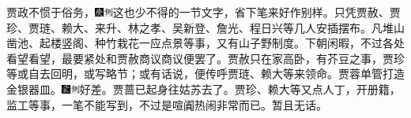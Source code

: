 {{{{{{{{{贾政不惯于俗务，{\includegraphics[width=3mm]{../Images/00004}\includegraphics[width=3mm]{../Images/00011}\footnotesize \kaishu 这也少不得的一节文字，省下笔来好作别样。}只凭贾赦、贾珍、贾琏、赖大、来升、林之孝、吴新登、詹光、程日兴等几人安插摆布。凡堆山凿池、起楼竖阁、种竹栽花一应点景等事，又有山子野制度。下朝闲暇，不过各处看望看望，最要紧处和贾赦商议商议便罢了。贾赦只在家高卧，有芥豆之事，贾珍等或自去回明，或写略节；或有话说，便传呼贾琏、赖大等来领命。贾蓉单管打造金银器皿。{\includegraphics[width=3mm]{../Images/00006}\includegraphics[width=3mm]{../Images/00011}\footnotesize \kaishu 好差。}贾蔷已起身往姑苏去了。贾珍、赖大等又点人丁，开册籍，监工等事，一笔不能写到，不过是喧阗热闹非常而已。暂且无话。

}}}}}}}}}

